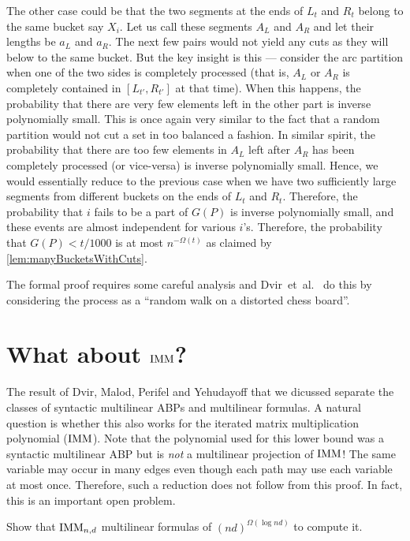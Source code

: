 The other case could be that the two segments at the ends of $L_t$ and $R_t$ belong to the same bucket say $X_i$.
Let us call these segments $A_L$ and $A_R$ and let their lengths be $a_L$ and $a_R$.
The next few pairs would not yield any cuts as they will below to the same bucket.
But the key insight is this --- consider the arc partition when one of the two sides is completely processed (that is, $A_L$ or $A_R$ is completely contained in $[L_{t'},R_{t'}]$ at that time).
When this happens, the probability that there are very few elements left in the other part is inverse polynomially small.
This is once again very similar to the fact that a random partition would not cut a set in too balanced a fashion.
In similar spirit, the probability that there are too few elements in $A_L$ left after $A_R$ has been completely processed (or vice-versa) is inverse polynomially small.
Hence, we would essentially reduce to the previous case when we have two sufficiently large segments from different buckets on the ends of $L_t$ and $R_t$.
Therefore, the probability that $i$ fails to be a part of $G(P)$ is inverse polynomially small, and these events are almost independent for various $i$'s.
Therefore, the probability that $G(P) < t/1000$ is at most $n^{-\Omega(t)}$ as claimed by \autoref{lem:manyBucketsWithCuts}.


The formal proof requires some careful analysis and Dvir~et~al.~\cite{dmpy12} do this by considering the process as a ``random walk on a distorted chess board''. 

\section{What about $\operatorname{\mathrm{IMM}}$?}

The result of Dvir, Malod, Perifel and Yehudayoff \cite{dmpy12} that we dicussed separate the classes of syntactic multilinear ABPs and multilinear formulas.
A natural question is whether this also works for the iterated matrix multiplication polynomial ($\operatorname{\mathrm{IMM}}$).
Note that the polynomial used for this lower bound was a syntactic multilinear ABP but is \emph{not} a multilinear projection of $\operatorname{\mathrm{IMM}}$!
The same variable may occur in many edges even though each path may use each variable at most once.
Therefore, such a reduction does not follow from this proof.
In fact, this is an important open problem.

\begin{openproblem}
  Show that $\operatorname{\mathrm{IMM}}_{n,d}$ multilinear formulas of $(nd)^{\Omega(\log nd)}$ to compute it. 
\end{openproblem}


